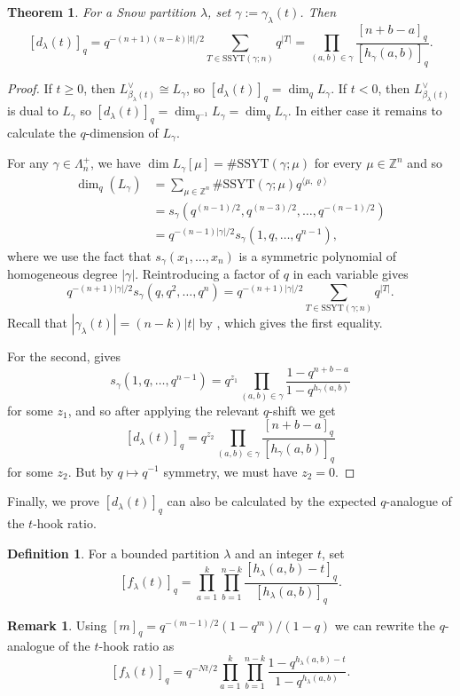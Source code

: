 \documentclass{amsart}
\newcommand\SSYT{\mathrm{SSYT}}
\newcommand\Z{\mathbb{Z}}
\theoremstyle{plain}
\newtheorem{theorem}{Theorem}[section]
\theoremstyle{definition}
\newtheorem{definition}[definition]{Definition}
\newtheorem{remark}[remark]{Remark}
\numberwithin{equation}{section}
\begin{document}
\begin{theorem}\label{thm:q-dimension-gamma}
For a Snow partition $\lambda$, set $\gamma:=\gamma_\lambda(t)$. Then
\[[d_\lambda(t)]_q=q^{-(n+1)(n-k)|t|/2}\sum_{T\in\SSYT(\gamma;n)}q^{|T|}=\prod_{(a,b)\in\gamma}\frac{[n+b-a]_q}{[h_\gamma(a,b)]_q}.\]
\end{theorem}
\begin{proof}
If $t\geq 0$, then $L_{\beta_\lambda(t)}^\vee\cong L_\gamma$, so $[d_\lambda(t)]_q=\dim_q L_\gamma$. If $t< 0$, then $L_{\beta_\lambda(t)}^\vee$ is dual to $L_\gamma$ so $[d_\lambda(t)]_q=\dim_{q^{-1}}L_\gamma=\dim_q L_\gamma$. In either case it remains to calculate the $q$-dimension of $L_\gamma$.

For any $\gamma\in\Lambda_n^+$, we have $\dim L_\gamma[\mu]=\#\SSYT(\gamma;\mu)$ for every $\mu\in\Z^n$ and so
\begin{align*}\dim_q(L_\gamma)&=\sum_{\mu\in\Z^n}\#\SSYT(\gamma;\mu)q^{\langle \mu,\varrho\rangle}\\
&=s_\gamma(q^{(n-1)/2},q^{(n-3)/2},\dots,q^{-(n-1)/2})\\
&=q^{-(n-1)|\gamma|/2}s_\gamma(1,q,\dots,q^{n-1}),\end{align*}
where we use the fact that $s_\gamma(x_1,\dots,x_n)$ is a symmetric polynomial of homogeneous degree $|\gamma|$. Reintroducing a factor of $q$ in each variable gives
\[q^{-(n+1)|\gamma|/2}s_\gamma(q,q^2,\dots,q^n)=q^{-(n+1)|\gamma|/2}\sum_{T\in\SSYT(\gamma;n)}q^{|T|}.\]
Recall that $|\gamma_\lambda(t)|=(n-k)|t|$ by , which gives the first equality.

For the second, \cite[\S3 Example 1]{Mac86} gives
\[s_\gamma(1,q,\dots,q^{n-1})=q^{z_1}\prod_{(a,b)\in\gamma}\frac{1-q^{n+b-a}}{1-q^{h_\gamma(a,b)}}\]
for some $z_1$, and so after applying the relevant $q$-shift we get
\[[d_\lambda(t)]_q=q^{z_2}\prod_{(a,b)\in\gamma}\frac{[n+b-a]_q}{[h_\gamma(a,b)]_q}\]
for some $z_2$. But by $q\mapsto q^{-1}$ symmetry, we must have $z_2=0$.
\end{proof}


Finally, we prove $[d_\lambda(t)]_q$ can also be calculated by the expected $q$-analogue of the $t$-hook ratio. 

\begin{definition}
For a bounded partition $\lambda$ and an integer $t$, set
\[[f_\lambda(t)]_q=\prod_{a=1}^k\prod_{b=1}^{n-k}\frac{[h_\lambda(a,b)-t]_q}{[h_\lambda(a,b)]_q}.\]
\end{definition}
\begin{remark}
Using $[m]_q=q^{-(m-1)/2}(1-q^m)/(1-q)$ we can rewrite the $q$-analogue of the $t$-hook ratio as
\[[f_\lambda(t)]_q=q^{-Nt/2}\prod_{a=1}^k\prod_{b=1}^{n-k}\frac{1-q^{h_\lambda(a,b)-t}}{1-q^{h_\lambda(a,b)}}.\]
\end{remark}
\end{document}
